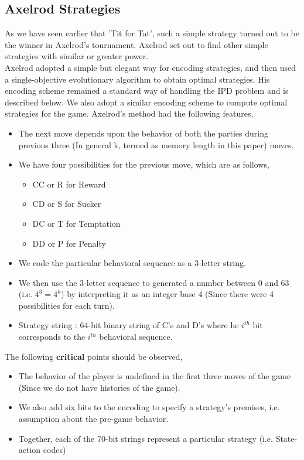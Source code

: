 \documentclass[a4paper]{article}
\begin{document}
	\subsection{Axelrod Strategies}	

As we have seen earlier that 'Tit for Tat', such a simple strategy turned out to be the winner in Axelrod's tournament. Axelrod set out to find other simple strategies with similar or greater power.\\
Axelrod adopted a simple but elegant way for encoding strategies, and then used a single-objective evolutionary algorithm to obtain optimal strategies. His encoding scheme remained a standard way of handling the IPD problem and is described below. We also adopt a similar encoding scheme to compute optimal strategies for the game. Axelrod's method had the following features,
	\begin{itemize}
	\item The next move depends upon the behavior of both the parties during previous three (In general k, termed as memory length in this paper) moves.
	\item We have four possibilities for the previous move, which are as follows,
	\begin{itemize}
		\item CC or R for Reward
		\item CD or S for Sucker
		\item DC or T for Temptation
		\item DD or P for Penalty
	\end{itemize}		
	\item We code the particular behavioral sequence as a 3-letter string.	
	\item We then use the 3-letter sequence to generated a number between 0 and 63 (i.e. $4^{3} = 4^{k}$) by interpreting it as an integer base 4 (Since there were 4 possibilities for each turn).
	\item Strategy string : 64-bit binary string of C's and D's where he $i^{th}$ bit corresponds to the $i^{th}$ behavioral sequence.
	\end{itemize}

	The following \textbf{critical} points should be observed,
	\begin{itemize}
	\item The behavior of the player is undefined in the first three moves of the game (Since we do not have histories of the game).
	\item We also add six bits to the encoding to specify a strategy's premises, i.e. assumption about the pre-game behavior.
	\item Together, each of the 70-bit strings represent a particular strategy (i.e. State-action codes)	
	\end{itemize}		
	
\end{document}
